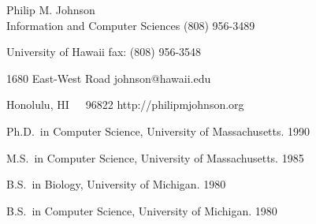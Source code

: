 


\newcommand{\newcategory}[1]{\newenvironment{#1}
 {\sectionheading{#1}\begin{list}{}{\setlength{\labelwidth}{0cm} \setlength{\labelsep}{0cm} \setlength{\itemsep}{0ex plus0.2ex} \setlength{\itemindent}{-1cm} \setlength{\leftmargin}{1cm} \setlength{\parsep}{0ex plus0.2ex}}}{\end{list}\par}}

\newcommand{\sectionheading}[1]{\medskip\pagebreak[2]\par\noindent
 {\small\bf #1}\nopagebreak}

\begin{center}
Philip M. Johnson\\
Information and Computer Sciences \hfill (808) 956-3489

University of Hawaii              \hfill fax: (808) 956-3548

1680 East-West Road               \hfill johnson@hawaii.edu

Honolulu, HI~~~96822              \hfill http://philipmjohnson.org

\end{center}

\newcategory{Professional Preparation}
\begin{Professional Preparation}
\item Ph.D.~in Computer Science, University of Massachusetts. 1990 
\item M.S.~in Computer Science, University of Massachusetts.  1985
\item B.S.~in Biology, University of Michigan. 1980
\item B.S.~in Computer Science, University of Michigan. 1980
\end{Professional Preparation}

